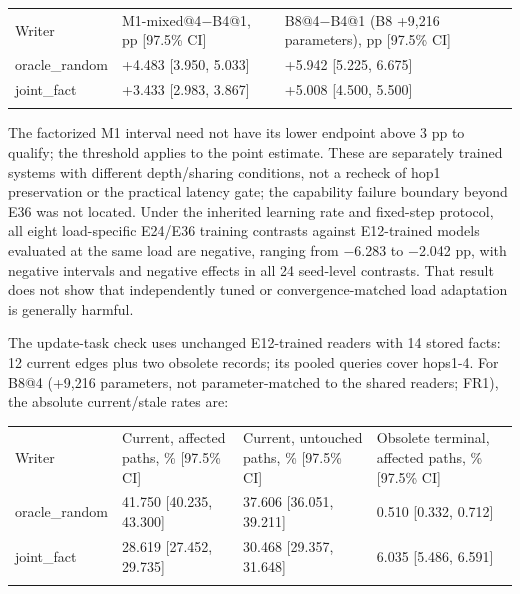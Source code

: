 {\small
\setlength{\tabcolsep}{3pt}
\begin{longtable}{W{187}{6}W{363}{6}W{451}{6}}
\toprule
Writer & M1-mixed@4\ensuremath{-}B4@1, pp [97.5\% CI] & B8@4\ensuremath{-}B4@1 (B8 +9,216 parameters), pp [97.5\% CI] \\ \addlinespace[3pt]
\midrule \endhead
oracle\_random & +4.483 [3.950, 5.033] & +5.942 [5.225, 6.675] \\ \addlinespace[3pt]  %
joint\_fact & +3.433 [2.983, 3.867] & +5.008 [4.500, 5.500] \\ \addlinespace[3pt]  %
\bottomrule
\end{longtable}
}


The factorized M1 interval need not have its lower endpoint above 3 pp to qualify;
the threshold applies to the point estimate. These are separately trained  %
systems with different depth/\allowbreak{}sharing conditions, not a recheck of hop1 preservation
or the practical latency gate; the capability failure boundary beyond E36 was not
located. Under the inherited learning rate and fixed-step  %
protocol, all eight load-specific E24/\allowbreak{}E36 training contrasts against E12-trained
models evaluated at the same load are negative, ranging from \ensuremath{-}6.283 to \ensuremath{-}2.042 pp,
with negative intervals and negative effects in all 24 seed-level contrasts. That result does not show that independently  %
tuned or convergence-matched load adaptation is generally harmful.  %

The update-task check uses unchanged E12-trained readers with 14 stored facts:
12 current edges plus two obsolete records; its pooled queries cover hops1-4.
 For B8@4 (+9,216 parameters, not parameter-matched to the shared readers;  %
FR1), the absolute current/\allowbreak{}stale rates are:


{\footnotesize
\setlength{\tabcolsep}{3pt}
\begin{longtable}{W{127}{8}W{285}{8}W{289}{8}W{299}{8}}
\toprule
Writer & Current, affected paths, \% [97.5\% CI] & Current, untouched paths, \% [97.5\% CI] & Obsolete terminal, affected paths, \% [97.5\% CI] \\ \addlinespace[3pt]
\midrule \endhead
oracle\_random & 41.750 [40.235, 43.300] & 37.606 [36.051, 39.211] & 0.510 [0.332, 0.712] \\ \addlinespace[3pt]  %
joint\_fact & 28.619 [27.452, 29.735] & 30.468 [29.357, 31.648] & 6.035 [5.486, 6.591] \\ \addlinespace[3pt]  %
\bottomrule
\end{longtable}
}


